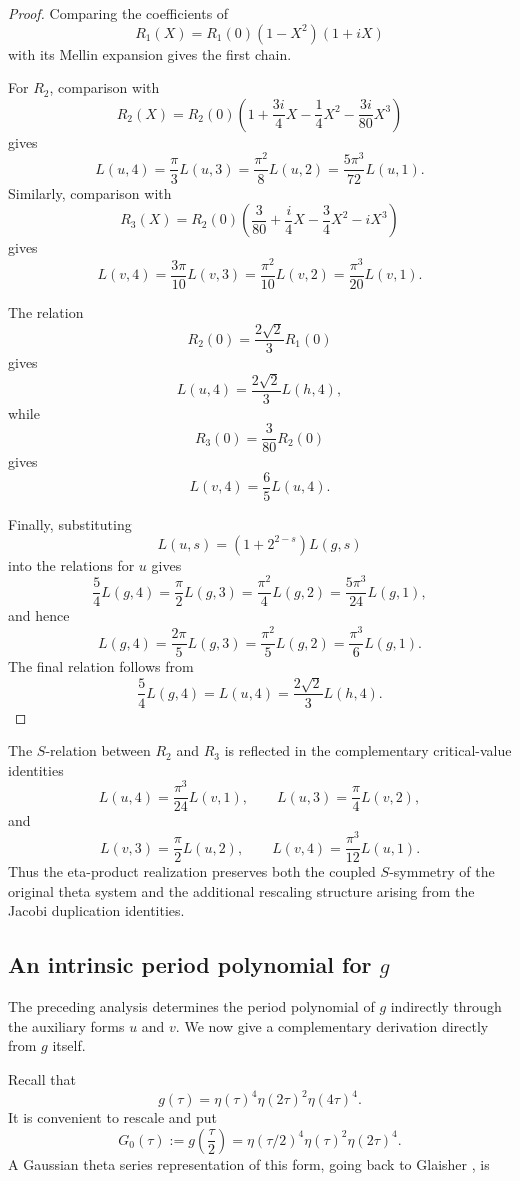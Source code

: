 \documentclass[preprint,12pt]{elsarticle}
\theoremstyle{definition}
\theoremstyle{remark}
\begin{document}
\begin{proof}
	Comparing the coefficients of
	\[
	R_1(X)=R_1(0)(1-X^2)(1+iX)
	\]
	with its Mellin expansion gives the first chain.
	
	For $R_2$, comparison with
	\[
	R_2(X)=R_2(0)\left(1+\frac{3i}{4}X-\frac{1}{4}X^2-\frac{3i}{80}X^3\right)
	\]
	gives
	\[
	L(u,4)=\frac{\pi}{3}L(u,3)=\frac{\pi^2}{8}L(u,2)=\frac{5\pi^3}{72}L(u,1).
	\]
	Similarly, comparison with
	\[
	R_3(X)=R_2(0)\left(\frac{3}{80}+\frac{i}{4}X-\frac{3}{4}X^2-iX^3\right)
	\]
	gives
	\[
	L(v,4)=\frac{3\pi}{10}L(v,3)=\frac{\pi^2}{10}L(v,2)=\frac{\pi^3}{20}L(v,1).
	\]
	
	The relation
	\[
	R_2(0)=\frac{2\sqrt{2}}{3}R_1(0)
	\]
	gives
	\[
	L(u,4)=\frac{2\sqrt{2}}{3}L(h,4),
	\]
	while
	\[
	R_3(0)=\frac{3}{80}R_2(0)
	\]
	gives
	\[
	L(v,4)=\frac{6}{5}L(u,4).
	\]
	
	Finally, substituting
	\[
	L(u,s)=\left(1+2^{2-s}\right)L(g,s)
	\]
	into the relations for $u$ gives
	\[
	\frac{5}{4}L(g,4)=\frac{\pi}{2}L(g,3)=\frac{\pi^2}{4}L(g,2)=\frac{5\pi^3}{24}L(g,1),
	\]
	and hence
	\[
	L(g,4)=\frac{2\pi}{5}L(g,3)=\frac{\pi^2}{5}L(g,2)=\frac{\pi^3}{6}L(g,1).
	\]
	The final relation follows from
	\[
	\frac{5}{4}L(g,4)=L(u,4)=\frac{2\sqrt{2}}{3}L(h,4).
	\]
\end{proof}

The $S$-relation between $R_2$ and $R_3$ is reflected in the complementary critical-value identities
\[
L(u,4)=\frac{\pi^3}{24}L(v,1),\qquad L(u,3)=\frac{\pi}{4}L(v,2),
\]
and
\[
L(v,3)=\frac{\pi}{2}L(u,2),\qquad L(v,4)=\frac{\pi^3}{12}L(u,1).
\]
Thus the eta-product realization preserves both the coupled $S$-symmetry of the original theta system and the additional rescaling structure arising from the Jacobi duplication identities.		

\subsection{An intrinsic period polynomial for $g$}

The preceding analysis determines the period polynomial of $g$ indirectly through the auxiliary forms $u$ and $v$.  We now give a complementary derivation directly from $g$ itself.

Recall that
\[
g(\tau)=\eta(\tau)^4\eta(2\tau)^2\eta(4\tau)^4.
\]
It is convenient to rescale and put
\[
G_0(\tau):=g\left(\frac{\tau}{2}\right)
=\eta(\tau/2)^4\eta(\tau)^2\eta(2\tau)^4.
\]
A Gaussian theta series representation of this form, going back to Glaisher \cite{glaisher1907representations}, is
\end{document}
